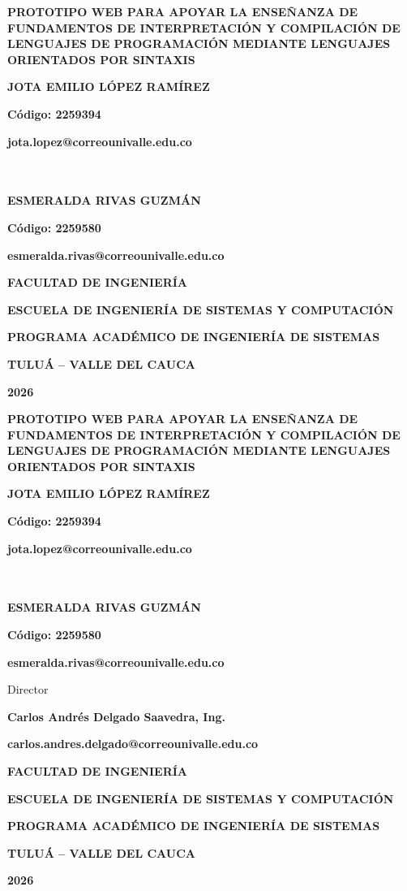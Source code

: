 \begin{titlepage}
		\begin{center}
			{\bf PROTOTIPO WEB PARA APOYAR LA ENSEÑANZA DE FUNDAMENTOS DE INTERPRETACIÓN Y COMPILACIÓN DE LENGUAJES DE PROGRAMACIÓN MEDIANTE LENGUAJES ORIENTADOS POR SINTAXIS \par}
			\vfill
			{\bf JOTA EMILIO LÓPEZ RAMÍREZ \par}
			{\bf Código: 2259394 \par}
			{\bf jota.lopez@correounivalle.edu.co \ \\ \ \\ \ \\}
			{\bf ESMERALDA RIVAS GUZMÁN \par}
			{\bf Código: 2259580 \par}
			{\bf esmeralda.rivas@correounivalle.edu.co \par}
			\vfill
			{\bf FACULTAD DE INGENIERÍA \par}
			{\bf ESCUELA DE INGENIERÍA DE SISTEMAS Y COMPUTACIÓN \par}
			{\bf PROGRAMA ACADÉMICO DE INGENIERÍA DE SISTEMAS \par}
			{\bf TULUÁ – VALLE DEL CAUCA \par}
			{\bf 2026 \par}
    \end{center}
\end{titlepage}


\begin{titlepage}
	\begin{center}
			{\bf PROTOTIPO WEB PARA APOYAR LA ENSEÑANZA DE FUNDAMENTOS DE INTERPRETACIÓN Y COMPILACIÓN DE LENGUAJES DE PROGRAMACIÓN MEDIANTE LENGUAJES ORIENTADOS POR SINTAXIS }
			\vfill
			{\bf JOTA EMILIO LÓPEZ RAMÍREZ \par}
			{\bf Código: 2259394 \par}
			{\bf jota.lopez@correounivalle.edu.co \ \\ \ \\ \ \\}
			{\bf ESMERALDA RIVAS GUZMÁN \par}
			{\bf Código: 2259580 \par}
			{\bf esmeralda.rivas@correounivalle.edu.co \par}
			\vfill

		{Director \par}
		{\bf Carlos Andrés Delgado Saavedra, Ing. \par}
		{\bf carlos.andres.delgado@correounivalle.edu.co \par}
			\vfill
			{\bf FACULTAD DE INGENIERÍA \par}
			{\bf ESCUELA DE INGENIERÍA DE SISTEMAS Y COMPUTACIÓN \par}
			{\bf PROGRAMA ACADÉMICO DE INGENIERÍA DE SISTEMAS \par}
			{\bf TULUÁ – VALLE DEL CAUCA \par}
			{\bf 2026 \par}
    \end{center}
\end{titlepage}
